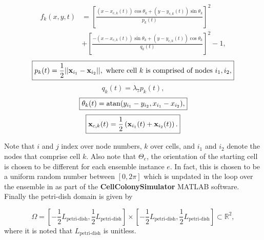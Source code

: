 \begin{equation}
    \boxed{
    \begin{split}
    f_k(x,y,t) &= \left[\frac{ (x-x_{c,k}(t))\cos{\theta_k} + (y-y_{c,k}(t)) \sin{\theta_k}}{p_k(t)} \right]^2 \\ 
               &+ \left[ \frac{-(x-x_{c,k}(t))\sin{\theta_k} +(y-y_{c,k}(t)) \cos{\theta_k}}{q_k(t)} \right]^2 - 1,
    \end{split}
    }
\end{equation}
\begin{equation}\label{eqn:semiMajorAxis}
    \boxed{p_k(t) = \frac{1}{2}||\vb{x}_{i_1} - \vb{x}_{i_2}||, \ 
    \textrm{where cell} \ k \ \textrm{is comprised of nodes} \ i_1, i_2,} 
\end{equation}
\begin{equation}\label{eqn:semiMinorAxis}
    \boxed{q_k(t) = \lambda_7 p_k(t), }
\end{equation}
\begin{equation}\label{eqn:orientationAngle}
    \boxed{\theta_k(t) = \atan (y_{i_1} - y_{i_2},x_{i_1} - x_{i_2} ), }
\end{equation}
\begin{equation} \label{eqn:centerPos}
    \boxed{ \vb{x}_{c,k}(t) = \frac{1}{2} \left(\vb{x}_{i_1}(t) + \vb{x}_{i_2}(t)\right). }
\end{equation}

Note that $i$ and $j$ index over node numbers, $k$ over cells, and $i_1$ and $i_2$ denote the nodes
that comprise cell $k$. Also note that $\Theta_e$, the orientation of the starting cell
is chosen to be different for each ensemble instance $e$. In fact,
this is chosen to be a uniform random number between $[0,2\pi]$ which
is unpdated in the loop over the ensemble in \codeword{Master.m} as part of the \textbf{CellColonySimulator}
MATLAB software.
Finally the petri-dish domain is given by 

\begin{equation}
    \boxed{\Omega = \left[-\frac{1}{2}L_{\textrm{petri-dish}},\frac{1}{2}L_{\textrm{petri-dish}} \right] \times
             \left[-\frac{1}{2}L_{\textrm{petri-dish}},\frac{1}{2}L_{\textrm{petri-dish}} \right] \subset \mathbb{R}^2,}
\end{equation}
where it is noted that $L_{\textrm{petri-dish}}$ is unitless.


